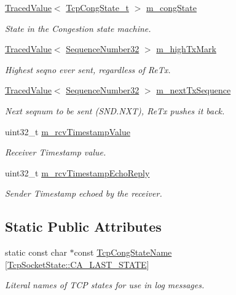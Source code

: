 \begin{DoxyCompactItemize}
\hyperlink{classns3_1_1TracedValue}{Traced\+Value}$<$ \hyperlink{classns3_1_1TcpSocketState_a6fc313945a33d48fd60cbffe0c787b19}{Tcp\+Cong\+State\+\_\+t} $>$ \hyperlink{classns3_1_1TcpSocketState_a4053e1eb120c572d0881b04620b52c30}{m\+\_\+cong\+State}
\begin{DoxyCompactList}\small\item\em State in the Congestion state machine. \end{DoxyCompactList}\item 
\hyperlink{classns3_1_1TracedValue}{Traced\+Value}$<$ \hyperlink{group__network_gacb2070e4e98d2d5135c9bede58f07a03}{Sequence\+Number32} $>$ \hyperlink{classns3_1_1TcpSocketState_a2c46f51fd8e2bf43b564ea838b43b8bb}{m\+\_\+high\+Tx\+Mark}
\begin{DoxyCompactList}\small\item\em Highest seqno ever sent, regardless of Re\+Tx. \end{DoxyCompactList}\item 
\hyperlink{classns3_1_1TracedValue}{Traced\+Value}$<$ \hyperlink{group__network_gacb2070e4e98d2d5135c9bede58f07a03}{Sequence\+Number32} $>$ \hyperlink{classns3_1_1TcpSocketState_ad1f77b1cbdb9267a89ebb6f16ac76892}{m\+\_\+next\+Tx\+Sequence}
\begin{DoxyCompactList}\small\item\em Next seqnum to be sent (S\+N\+D.\+N\+XT), Re\+Tx pushes it back. \end{DoxyCompactList}\item 
uint32\+\_\+t \hyperlink{classns3_1_1TcpSocketState_af590aa7004c1b09e4e20defd75a7e84a}{m\+\_\+rcv\+Timestamp\+Value}
\begin{DoxyCompactList}\small\item\em Receiver Timestamp value. \end{DoxyCompactList}\item 
uint32\+\_\+t \hyperlink{classns3_1_1TcpSocketState_a930be195736a97e37b7a1f92360b6261}{m\+\_\+rcv\+Timestamp\+Echo\+Reply}
\begin{DoxyCompactList}\small\item\em Sender Timestamp echoed by the receiver. \end{DoxyCompactList}\end{DoxyCompactItemize}
\subsection*{Static Public Attributes}
\begin{DoxyCompactItemize}
\item 
static const char $\ast$const \hyperlink{classns3_1_1TcpSocketState_a5ef7513bf909c4d8b728cb8d25ad4a3b}{Tcp\+Cong\+State\+Name} \mbox{[}\hyperlink{classns3_1_1TcpSocketState_a6fc313945a33d48fd60cbffe0c787b19a57dd96a466459795fb936f3df57ae52f}{Tcp\+Socket\+State\+::\+C\+A\+\_\+\+L\+A\+S\+T\+\_\+\+S\+T\+A\+TE}\mbox{]}
\begin{DoxyCompactList}\small\item\em Literal names of T\+CP states for use in log messages. \end{DoxyCompactList}\end{DoxyCompactItemize}
